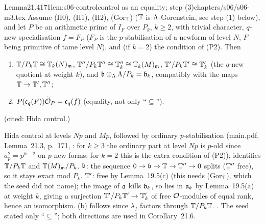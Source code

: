 \begin{quoted}{Lemma}{21.4}{171}{lem:s06-control}{control as an equality; step (3)}{chapters/s06/s06-m3.tex}\label{rpt:lem:s06-control}
Assume (H0), (H1), (H2), (Gor$_{\mathbb{T}}$) ($\mathbb{T}$ is $\Lambda$-Gorenstein, see step (1) below), and let $P$ be an arithmetic prime of $I_F$
over $P_k$, $k\ge2$, with trivial character, $q$-new specialisation $f=F_P$ ($F_P$ is the $p$-stabilisation of a newform of level $N$, $F$ being primitive of tame level $N$), and (if $k=2$) the condition of (P2). Then
\begin{enumerate}[label=(\alph*)]
\item $\mathbb{T}/P_k\mathbb{T}\cong\mathbb{T}_k(N)_{\mathfrak{m}}$, $\mathbb{T}''/P_k\mathbb{T}''\cong\mathbb{T}''_k\cong\mathbb{T}_k(M)_{\mathfrak{m}}$, $\mathbb{T}'/P_k\mathbb{T}'\cong\mathbb{T}'_k$ (the $q$-new quotient at weight $k$), and
  $\mathfrak{b}\otimes_\Lambda\Lambda/P_k=\mathfrak{b}_k$, compatibly with the maps $\mathbb{T}\to\mathbb{T}',\mathbb{T}''$;
\item $P(\mathfrak{c}_q(F))\widetilde{\mathcal{O}}_P=\mathfrak{c}_q(f)$ (equality, not only ``$\subseteq$'').
\end{enumerate}
\stpmc{} (cited: Hida control.)
\end{quoted}
\begin{outline}
Hida control \cite[Cor.~3.2, (3.3b), p.~250]{Hi86b} \stcited{} at levels $Np$ and $Mp$, followed by ordinary $p$-stabilisation
(main.pdf, Lemma~21.3, p.~171, \stpmc: for $k\ge3$ the ordinary part at level $Np$ is $p$-old since $a_p^2=p^{k-2}$ on $p$-new forms; for
$k=2$ this is the extra condition of (P2)), identifies $\mathbb{T}/P_k\mathbb{T}$ and $\mathbb{T}(M)_{\mathfrak{m}}/P_k$. $\mathfrak{b}$: the sequence $0\to\mathfrak{b}\to\mathbb{T}\to\mathbb{T}''\to0$ splits
($\mathbb{T}''$ free), so it stays exact mod $P_k$. $\mathbb{T}'$: free by Lemma~19.5(c) (this needs (Gor$_{\mathbb{T}}$), which the seed did not name); the image of
$\mathfrak{a}$ kills $\mathfrak{b}_k$, so lies in $\mathfrak{a}_k$ by Lemma~19.5(a) at weight $k$, giving a surjection $\mathbb{T}'/P_k\mathbb{T}'\to\mathbb{T}'_k$ of free $\mathcal{O}$-modules of equal
rank, hence an isomorphism. (b) follows since $\lambda_f$ factors through $\mathbb{T}/P_k\mathbb{T}$. \stpmc. The seed stated only ``$\subseteq$''; both
directions are used in Corollary~21.6.
\end{outline}

